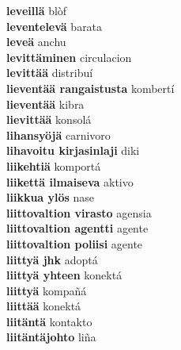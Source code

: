 \textbf{ leveillä  } blòf \\
\textbf{ leventelevä  } barata \\
\textbf{ leveä  } anchu \\
\textbf{ levittäminen  } circulacion \\
\textbf{ levittää  } distribuí \\
\textbf{ lieventää rangaistusta  } kombertí \\
\textbf{ lieventää  } kibra \\
\textbf{ lievittää  } konsolá \\
\textbf{ lihansyöjä  } carnivoro \\
\textbf{ lihavoitu kirjasinlaji  } diki \\
\textbf{ liikehtiä  } komportá \\
\textbf{ liikettä ilmaiseva  } aktivo \\
\textbf{ liikkua ylös  } nase \\
\textbf{ liittovaltion  virasto  } agensia \\
\textbf{ liittovaltion agentti  } agente \\
\textbf{ liittovaltion poliisi  } agente \\
\textbf{ liittyä jhk  } adoptá \\
\textbf{ liittyä yhteen  } konektá \\
\textbf{ liittyä  } kompañá \\
\textbf{ liittää  } konektá \\
\textbf{ liitäntä  } kontakto \\
\textbf{ liitäntäjohto  } liña \\
